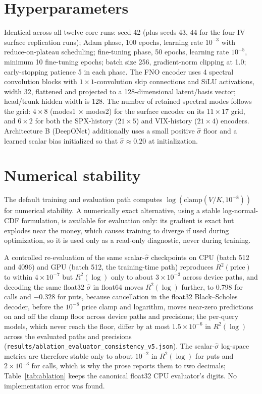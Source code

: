 \documentclass[11pt]{article}
\begin{document}



\appendix

\section{Hyperparameters}
\label{app:hyper}
Identical across all twelve core runs: seed 42 (plus seeds 43, 44 for the four IV-surface replication
runs); Adam phase, 100 epochs, learning rate $10^{-3}$ with reduce-on-plateau scheduling; fine-tuning
phase, 50 epochs, learning rate $10^{-5}$, minimum 10 fine-tuning epochs; batch size 256,
gradient-norm clipping at 1.0; early-stopping patience 5 in each phase. The FNO encoder uses 4 spectral
convolution blocks with $1{\times}1$-convolution skip connections and SiLU activations, width 32,
flattened and projected to a 128-dimensional latent/basis vector; head/trunk hidden width is 128. The
number of retained spectral modes follows the grid: $4 \times 8$ (modes1 $\times$ modes2) for the
surface encoder on its $11 \times 17$ grid, and $6 \times 2$ for both the SPX-history ($21 \times 5$)
and VIX-history ($21 \times 4$) encoders.
Architecture B (DeepONet) additionally uses a small positive $\hat\sigma$ floor and a learned scalar
bias initialized so that $\hat\sigma \approx 0.20$ at initialization.

\section{Numerical stability}
\label{app:numstab}
The default training and evaluation path computes $\log(\mathrm{clamp}(V/K, 10^{-8}))$ for numerical
stability. A numerically exact alternative, using a stable log-normal-CDF formulation, is available for
evaluation only: its gradient is exact but explodes near the money, which causes training to diverge if
used during optimization, so it is used only as a read-only diagnostic, never during training.

A controlled re-evaluation of the same scalar-$\hat\sigma$ checkpoints on CPU (batch 512 and 4096) and
GPU (batch 512, the training-time path) reproduces $R^2(\text{price})$ to within $4\times10^{-7}$ but
$R^2(\log)$ only to about $3\times10^{-3}$ across device paths, and decoding the same float32
$\hat\sigma$ in float64 moves $R^2(\log)$ further, to 0.798 for calls and $-0.328$ for puts, because
cancellation in the float32 Black--Scholes decoder, before the $10^{-8}$ price clamp and logarithm,
moves near-zero predictions on and off the clamp floor across device paths and precisions; the
per-query models, which never reach the floor, differ by at most $1.5\times10^{-6}$ in $R^2(\log)$
across the evaluated paths and precisions
(\texttt{results/ablation\_evaluator\_consistency\_v5.json}). The scalar-$\hat\sigma$ log-space metrics
are therefore stable only to about $10^{-2}$ in $R^2(\log)$ for puts and $2\times10^{-3}$ for calls,
which is why the prose reports them to two decimals; Table~\ref{tab:ablation} keeps the canonical
float32 CPU evaluator's digits. No implementation error was found.
\end{document}
